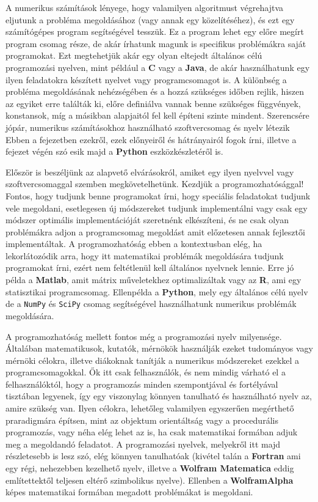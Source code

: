 
    A numerikus számítások lényege, hogy valamilyen algoritmust végrehajtva
eljutunk a probléma megoldásához (vagy annak egy közelítéséhez), és ezt egy számítógépes
program segítségével tesszük. Ez a program lehet egy előre megírt
program csomag része, de akár írhatunk magunk is specifikus problémákra
saját programokat. Ezt megtehetjük akár egy olyan eltejedt általános célú
programozási nyelven, mint például a \textbf{C} vagy a \textbf{Java}, de
akár használhatunk egy ilyen feladatokra készített nyelvet vagy
programcsomagot is. A különbség a probléma megoldásának nehézségében és a hozzá szükséges időben rejlik,
hiszen az egyiket erre találták ki, előre definiálva vannak benne
szükséges függvények, konstansok, míg a másikban alapjaitól fel kell
építeni szinte mindent. Szerencsére jópár, numerikus számításokhoz
használható szoftvercsomag és nyelv létezik
Ebben a fejezetben ezekről,
ezek előnyeiről és hátrányairól fogok írni, illetve a fejezet végén
szó esik majd a \textbf{Python} eszközkészletéről is.


Először is beszéljünk az alapvető elvárásokról, amiket egy ilyen
nyelvvel vagy szoftvercsomaggal szemben megkövetelhetünk. Kezdjük a
programozhatósággal! Fontos, hogy tudjunk benne programokat írni, hogy
speciális feladatokat tudjunk vele megoldani, esetlegesen új módszereket
tudjunk implementálni vagy csak egy módszer optimális implementációját
szeretnénk elkészíteni, és ne csak olyan problémákra adjon a
programcsomag megoldást amit előzetesen annak fejlesztői implementáltak.
A programozhatóság ebben a kontextusban elég, ha lekorlátozódik arra,
hogy itt matematikai problémák megoldására tudjunk programokat írni,
ezért nem feltétlenül kell általános nyelvnek lennie. Erre jó példa a
\textbf{Matlab}, amit mátrix műveletekhez optimalizáltak vagy az
\textbf{R}, ami egy statisztikai programcsomag. Ellenpélda a
\textbf{Python}, mely egy általános célú nyelv de a \texttt{NumPy} \cite{numpy} és
\texttt{SciPy} \cite{scipy} csomag segítségével használhatunk numerikus problémák
megoldására.

A programozhatóság mellett fontos még a programozási nyelv milyensége.
Általában matematikusok, kutatók, mérnökök használják ezeket tudományos
vagy mérnöki célokra, illetve diákoknak tanítják a numerikus módszereket
ezekkel a programcsomagokkal. Ők itt csak felhasználók, és nem mindig
várható el a felhasználóktól, hogy a programozás minden szempontjával és
fortélyával tisztában legyenek, így egy viszonylag könnyen tanulható és
használható nyelv az, amire szükség van.
Ilyen célokra, lehetőleg
valamilyen egyszerűen megérthető praradigmára építsen, mint az objektum
orientáltság vagy a procedurális programozás, vagy néha elég lehet az
is, ha csak matematikai formában adjuk meg a megoldandó feladatot. A
programozási nyelvek, melyekről itt majd részletesebb is lesz szó, elég
könnyen tanulhatóak (kivétel talán a \textbf{Fortran} ami egy régi,
nehezebben kezelhető nyelv, illetve a \textbf{Wolfram Matematica} eddig
említettektől teljesen eltérő szimbolikus nyelve). Ellenben a
\textbf{WolframAlpha} képes matematikai formában megadott problémákat is
megoldani.


